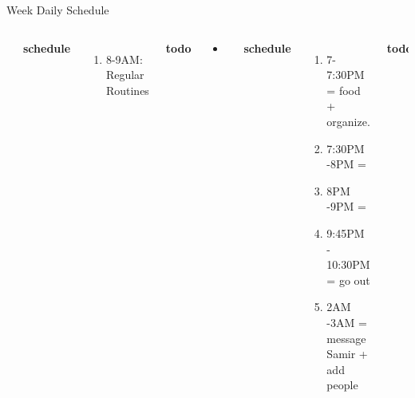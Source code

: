 \documentclass[serif, mathserif, final]{beamer}
\begin{document}
\begin{frame}
\begin{columns}
\begin{column}{0.50\linewidth}
\begin{block}{Week Daily Schedule}
\begin{columns}
\begin{itemize}
          \end{itemize}
          \textbf{\small schedule}\\
          \begin{enumerate}
            \tiny \item \tiny 8-9AM: Regular Routines 
          \end{enumerate}
          
          \textbf{\small todo}\\
          \begin{itemize} 
            \tiny \item \tiny
          \end{itemize}
          \textbf{\small schedule}\\ 
          \begin{enumerate}
            \tiny \item \tiny 7-7:30PM = food + organize.  
            \tiny \item \tiny 7:30PM -8PM = 
            \tiny \item \tiny 8PM -9PM = 
            \tiny \item \tiny 9:45PM - 10:30PM = go out 
            \tiny \item \tiny 2AM -3AM =  message Samir + add people
          \end{enumerate}
          
          \textbf{\small todo}\\
          \begin{itemize} 
            \tiny \item \tiny Work: Organize stuff in work directory 
          \item \tiny Mgmt: Spaces: black socks  + Mgmt:Spaces: gray
            shirt. 
          \item \tiny Worklife: post of weekend   +  (worklife: update
            picture )  + worklife: update slides )  <-- clarify what
            we were doing this week 
          \item \tiny Comm: respond to girl. 
          \end{itemize}

          \textbf{\small schedule}\\
          \begin{enumerate} 
            \tiny \item \tiny 3PM - 4PM  = think about weekend, any
            other tasks 
          \item \tiny 5-7PM = Comm work 
          \item \tiny 8PM - 10PM = worklife work. 
          \end{enumerate} 
        \end{columns}
      \end{block}
    \end{column}%
    

\end{columns}
\end{frame}
\end{document}
